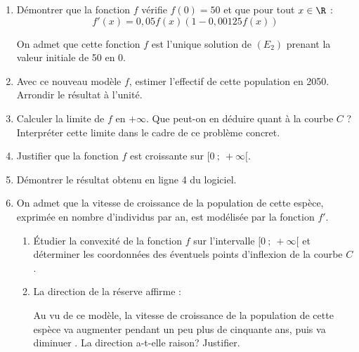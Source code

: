 	\begin{enumerate}
		\item Démontrer que la fonction $f$ vérifie $f(0)=50$ et que pour tout $x \in \R$ :
		$$
		f'(x)=0,05 f(x)(1-0,00125 f(x))
		$$

		On admet que cette fonction $f$ est l'unique solution de $(E_{2})$ prenant la valeur initiale de 50 en 0.

		\item Avec ce nouveau modèle $f$, estimer l'effectif de cette population en 2050. Arrondir le résultat à l'unité.

		\item Calculer la limite de $f$ en $+\infty$. Que peut-on en déduire quant à la courbe $C$ ? Interpréter cette limite dans le cadre de ce problème concret.

		\item Justifier que la fonction $f$ est croissante sur $[0 ~;~+\infty[$.

		\item Démontrer le résultat obtenu en ligne 4 du logiciel.

		\item On admet que la vitesse de croissance de la population de cette espèce, exprimée en nombre d'individus par an, est modélisée par la fonction $f'$.
		\begin{enumerate}
			\item Étudier la convexité de la fonction $f$ sur l'intervalle $[0 ~;~ +\infty[$ et déterminer les coordonnées des éventuels points d'inflexion de la courbe $C$.

			\item La direction de la réserve affirme :

			\og Au vu de ce modèle, la vitesse de croissance de la population de cette espèce va augmenter pendant un peu plus de cinquante ans, puis va diminuer \fg{}. La direction a-t-elle raison? Justifier.
		\end{enumerate}
	\end{enumerate}

\bigskip
